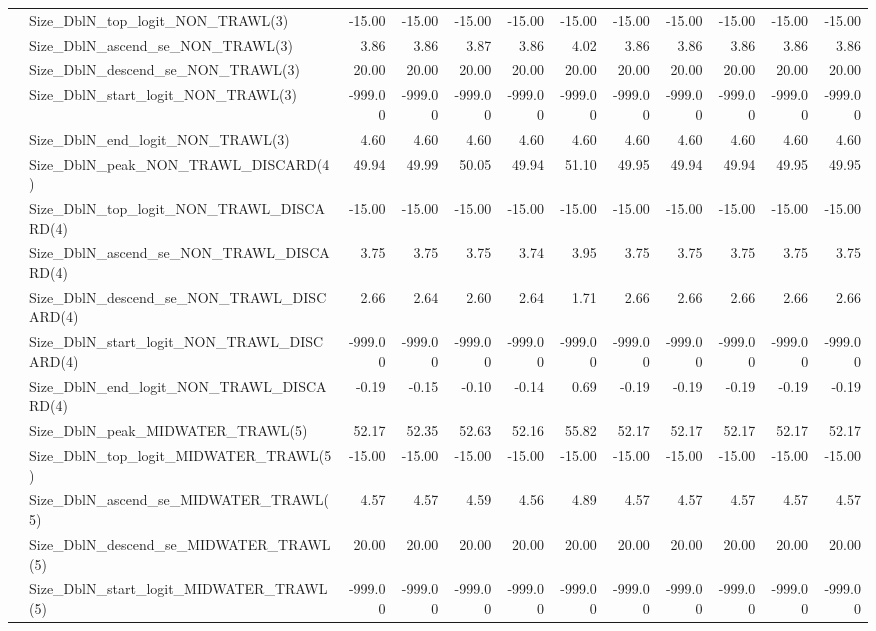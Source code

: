 \documentclass[
]{scrartcl}
\begin{document}
\begin{landscape}
\begin{longtable}{llrrrrrrrrrr}
 & Size\_DblN\_top\_logit\_NON\_TRAWL(3) & -15.00 & -15.00 & -15.00 & -15.00 & -15.00 & -15.00 & -15.00 & -15.00 & -15.00 & -15.00 \\ 
 & Size\_DblN\_ascend\_se\_NON\_TRAWL(3) & 3.86 & 3.86 & 3.87 & 3.86 & 4.02 & 3.86 & 3.86 & 3.86 & 3.86 & 3.86 \\ 
 & Size\_DblN\_descend\_se\_NON\_TRAWL(3) & 20.00 & 20.00 & 20.00 & 20.00 & 20.00 & 20.00 & 20.00 & 20.00 & 20.00 & 20.00 \\ 
 & Size\_DblN\_start\_logit\_NON\_TRAWL(3) & -999.00 & -999.00 & -999.00 & -999.00 & -999.00 & -999.00 & -999.00 & -999.00 & -999.00 & -999.00 \\ 
 & Size\_DblN\_end\_logit\_NON\_TRAWL(3) & 4.60 & 4.60 & 4.60 & 4.60 & 4.60 & 4.60 & 4.60 & 4.60 & 4.60 & 4.60 \\ 
 & Size\_DblN\_peak\_NON\_TRAWL\_DISCARD(4) & 49.94 & 49.99 & 50.05 & 49.94 & 51.10 & 49.95 & 49.94 & 49.94 & 49.95 & 49.95 \\ 
 & Size\_DblN\_top\_logit\_NON\_TRAWL\_DISCARD(4) & -15.00 & -15.00 & -15.00 & -15.00 & -15.00 & -15.00 & -15.00 & -15.00 & -15.00 & -15.00 \\ 
 & Size\_DblN\_ascend\_se\_NON\_TRAWL\_DISCARD(4) & 3.75 & 3.75 & 3.75 & 3.74 & 3.95 & 3.75 & 3.75 & 3.75 & 3.75 & 3.75 \\ 
 & Size\_DblN\_descend\_se\_NON\_TRAWL\_DISCARD(4) & 2.66 & 2.64 & 2.60 & 2.64 & 1.71 & 2.66 & 2.66 & 2.66 & 2.66 & 2.66 \\ 
 & Size\_DblN\_start\_logit\_NON\_TRAWL\_DISCARD(4) & -999.00 & -999.00 & -999.00 & -999.00 & -999.00 & -999.00 & -999.00 & -999.00 & -999.00 & -999.00 \\ 
 & Size\_DblN\_end\_logit\_NON\_TRAWL\_DISCARD(4) & -0.19 & -0.15 & -0.10 & -0.14 & 0.69 & -0.19 & -0.19 & -0.19 & -0.19 & -0.19 \\ 
 & Size\_DblN\_peak\_MIDWATER\_TRAWL(5) & 52.17 & 52.35 & 52.63 & 52.16 & 55.82 & 52.17 & 52.17 & 52.17 & 52.17 & 52.17 \\ 
 & Size\_DblN\_top\_logit\_MIDWATER\_TRAWL(5) & -15.00 & -15.00 & -15.00 & -15.00 & -15.00 & -15.00 & -15.00 & -15.00 & -15.00 & -15.00 \\ 
 & Size\_DblN\_ascend\_se\_MIDWATER\_TRAWL(5) & 4.57 & 4.57 & 4.59 & 4.56 & 4.89 & 4.57 & 4.57 & 4.57 & 4.57 & 4.57 \\ 
 & Size\_DblN\_descend\_se\_MIDWATER\_TRAWL(5) & 20.00 & 20.00 & 20.00 & 20.00 & 20.00 & 20.00 & 20.00 & 20.00 & 20.00 & 20.00 \\ 
 & Size\_DblN\_start\_logit\_MIDWATER\_TRAWL(5) & -999.00 & -999.00 & -999.00 & -999.00 & -999.00 & -999.00 & -999.00 & -999.00 & -999.00 & -999.00 \\ 

\end{longtable}
\end{landscape}
\end{document}
